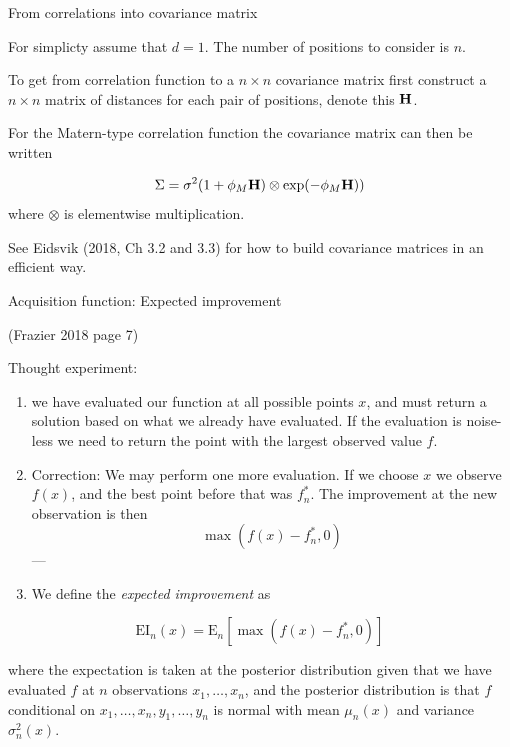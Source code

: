 \documentclass[
  ignorenonframetext,
]{beamer}
\begin{document}
\begin{frame}

\begin{block}{From correlations into covariance matrix}

For simplicty assume that \(d=1\). The number of positions to consider
is \(n\).

To get from correlation function to a \(n \times n\) covariance matrix
first construct a \(n \times n\) matrix of distances for each pair of
positions, denote this \({\bf H}\).

For the Matern-type correlation function the covariance matrix can then
be written

\[ \Sigma=\sigma^2 (1+\phi_M {\bf H}) \otimes \exp(-\phi_M {\bf H}))\]
where \(\otimes\) is elementwise multiplication.

See Eidsvik (2018, Ch 3.2 and 3.3) for how to build covariance matrices
in an efficient way.

\end{block}

\end{frame}

\begin{frame}

\begin{block}{Acquisition function: Expected improvement}

(Frazier 2018 page 7)

Thought experiment:

\begin{enumerate}
[1)]
\item
  we have evaluated our function at all possible points \(x\), and must
  return a solution based on what we already have evaluated. If the
  evaluation is noise-less we need to return the point with the largest
  observed value \(f\).
\item
  Correction: We may perform one more evaluation. If we choose \(x\) we
  observe \(f(x)\), and the best point before that was \(f^{*}_n\). The
  improvement at the new observation is then \[ \max(f(x)-f^{*}_n,0)\]
  ---
\item
  We define the \emph{expected improvement} as
\end{enumerate}

\[ \text{EI}_n(x)=\text{E}_n[\max(f(x)-f^{*}_n,0)]\]

where the expectation is taken at the posterior distribution given that
we have evaluated \(f\) at \(n\) observations \(x_1,\ldots, x_n\), and
the posterior distribution is that \(f\) conditional on
\(x_1,\ldots,x_n,y_1,\ldots,y_n\) is normal with mean \(\mu_n(x)\) and
variance \(\sigma^2_n(x)\).

\end{block}

\end{frame}
\end{document}

